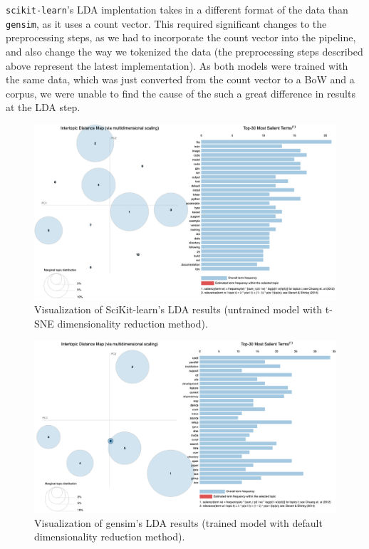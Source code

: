 \documentclass[11pt, conference, onecolumn, final]{IEEEtran}
\begin{document}
\verb|scikit-learn|'s LDA implentation takes in a different format of the data
than \verb|gensim|, as it uses a count vector.
This required significant changes to the preprocessing steps, as we had to
incorporate the count vector into the pipeline, and also change the way we
tokenized the data (the preprocessing steps described above represent the
latest implementation).
As both models were trained with the same data, which was just converted from
the count vector to a BoW and a corpus, we were unable to find the cause of the
such a great difference in results at the LDA step.

\begin{figure}[H]
    \centering
    \includegraphics[width=0.95\linewidth]{sklearn-default.png}
    \caption{Visualization of SciKit-learn's LDA results (untrained model with
        t-SNE dimensionality reduction method).}
    \label{fig:lda_sklearn_untrained_mds}
\end{figure}

\begin{figure}[H]
    \centering
    \includegraphics[width=0.95\linewidth]{gensim.png}
    \caption{Visualization of gensim's LDA results (trained model with default
        dimensionality reduction method).}
    \label{fig:lda_gensim}
\end{figure}
\end{document}
